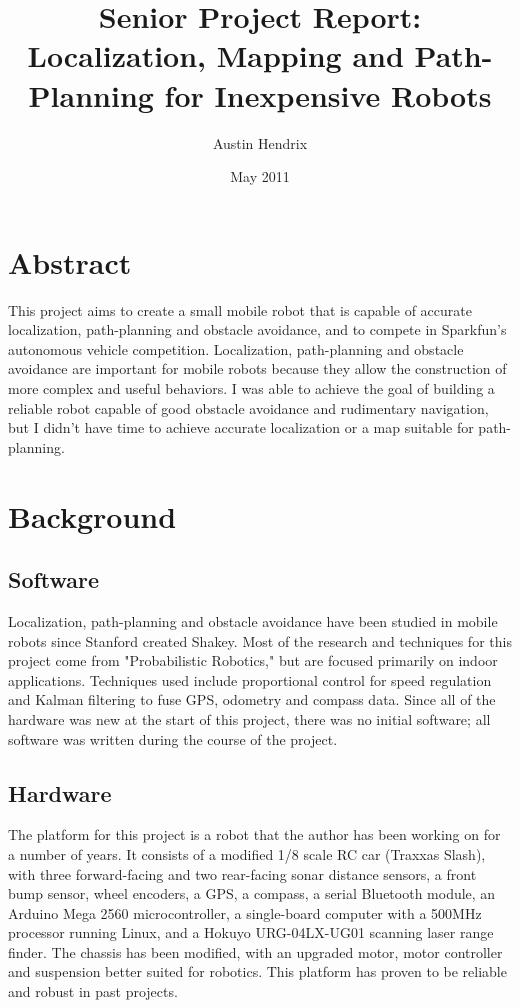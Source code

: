 \documentclass[a4paper,12pt]{article}
\begin{document}
\title{Senior Project Report: Localization, Mapping and Path-Planning for Inexpensive Robots}
\author{Austin Hendrix}
\date{May 2011}
\maketitle

\section{Abstract}
This project aims to create a small mobile robot that is capable of accurate localization, path-planning and obstacle avoidance, and to compete in Sparkfun's autonomous vehicle competition\cite{avc}. Localization, path-planning and obstacle avoidance are important for mobile robots because they allow the construction of more complex and useful behaviors. I was able to achieve the goal of building a reliable robot capable of good obstacle avoidance and rudimentary navigation, but I didn't have time to achieve accurate localization or a map suitable for path-planning.

\section{Background}
\subsection{Software}
Localization, path-planning and obstacle avoidance have been studied in mobile robots since Stanford created Shakey\cite{shakey}. Most of the research and techniques for this project come from "Probabilistic Robotics,"\cite{thrun} but are focused primarily on indoor applications. Techniques used include proportional control for speed regulation and Kalman filtering to fuse GPS, odometry and compass data. Since all of the hardware was new at the start of this project, there was no initial software; all software was written during the course of the project.

\subsection{Hardware}
The platform for this project is a robot that the author has been working on for a number of years. It consists of a modified 1/8 scale RC car (Traxxas Slash\cite{traxxas}), with three forward-facing and two rear-facing sonar distance sensors, a front bump sensor, wheel encoders, a GPS, a compass, a serial Bluetooth module, an Arduino Mega 2560 microcontroller, a single-board computer with a 500MHz processor running Linux, and a Hokuyo URG-04LX-UG01 scanning laser range finder. The chassis has been modified, with an upgraded motor, motor controller and suspension better suited for robotics. This platform has proven to be reliable and robust in past projects.
\end{document}
